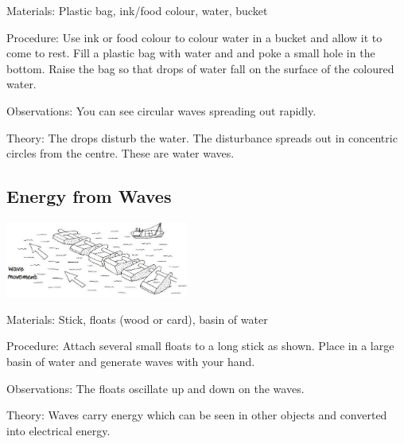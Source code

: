 \begin{multicols}{2}
\begin{description*}
\item[Materials:]{Plastic bag, ink/food colour, water, bucket}
\item[Procedure:]{Use ink or food colour to colour water in a bucket and allow it to come to rest. Fill a plastic bag with water and and poke a small hole in the bottom. Raise the bag so that drops of water fall on the surface of the coloured water.}
\item[Observations:]{You can see circular waves spreading out rapidly.}
\item[Theory:]{The drops disturb the water. The disturbance spreads out in concentric circles from the centre. These are water waves.}
\end{description*}

\subsection{Energy from Waves}

\begin{center}
\includegraphics[width=0.45\textwidth]{./img/vso/energy-waves.jpg}
\end{center}

\begin{description*}
\item[Materials:]{Stick, floats (wood or card), basin of water}
\item[Procedure:]{Attach several small floats to a long stick as shown. Place in a large basin of water and generate waves with your hand.}
\item[Observations:]{The floats oscillate up and down on the waves.}
\item[Theory:]{Waves carry energy which can be seen in other objects and converted into electrical energy.}
\end{description*}


\end{multicols}
